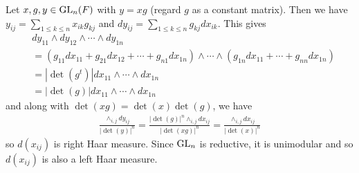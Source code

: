 \begin{problem} \notfinish
\end{problem}
\begin{problem} \notfinish
\end{problem}
\begin{problem} \notfinish
\end{problem}

\begin{problem}
Let $x, g, y \in \operatorname{\mathrm{GL}}_n(F)$ with $y = xg$ (regard $g$ as a constant matrix).
Then we have $y_{ij} = \sum_{1\leq k \leq n} x_{ik}g_{kj}$ and $dy_{ij} = \sum_{1\leq k \leq n} g_{kj}dx_{ik}$.
This gives
\begin{align*}
&dy_{11} \wedge dy_{12} \wedge \cdots \wedge dy_{1n} \\
&= (g_{11}dx_{11} + g_{21}dx_{12} + \cdots + g_{n1}dx_{1n}) \wedge \cdots \wedge (g_{1n}dx_{11} + \cdots + g_{nn}dx_{1n}) \\
&= |\det(g^{t})| dx_{11} \wedge \cdots \wedge dx_{1n} \\
&= |\det(g)| dx_{11} \wedge \cdots \wedge dx_{1n}
\end{align*}
and along with $\det(xg) = \det(x) \det(g)$, we have
\begin{align*}
    \frac{\wedge_{i, j}dy_{ij}}{|\det(y)|^{n}} = \frac{|\det(g)|^{n} \wedge_{i, j} dx_{ij}}{|\det(xg)|^{n}} = \frac{\wedge_{i, j} dx_{ij}}{|\det(x)|^{n}}
\end{align*}
so $d(x_{ij})$ is right Haar measure. Since $\operatorname{\mathrm{GL}}_{n}$ is reductive, it is unimodular and so $d(x_{ij})$ is also a left Haar measure.
\end{problem}

\begin{problem} \notfinish
\end{problem}
\begin{problem} \notfinish
\end{problem}

